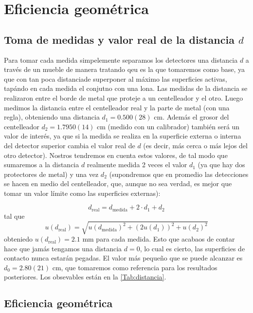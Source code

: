 \documentclass[11pt]{article}
\begin{document}
\section{Eficiencia geométrica}

\subsection{Toma de medidas y valor real de la distancia $d$}

Para tomar cada medida simpelemente separamos los detectores una distancia $d$ a través de un mueble de manera tratando  qeu es la que tomaremos como base, ya que con tan poca distanciade superponer al máximo las superficies activas, tapándo en cada medida el conjutno con una lona. Las medidas de la distancia se realizaron entre el borde de metal que proteje a un centelleador y el otro. Luego medimos la distancia entre el centelleador real y la parte de metal (con una regla), obteniendo una distancia $d_1=0.500(28)$ cm. Además el grosor del centelleador $d_2=1.7950(14)$ cm (medido con un calibrador) también será un valor de interés, ya que si la medida se realiza en la superficie externa o interna del detector superior cambia el valor real de $d$ (es decir, más cerca o más lejos del otro detector). Nostros tendremos en cuenta estos valores, de tal modo que sumaremos a la distancia $d$ realmente medida 2 veces el valor $d_1$ (ya que hay dos protectores de metal) y una vez $d_2$ (supondremos que en promedio las detecciones se hacen en medio del centelleador, que, aunque no sea verdad, es mejor que tomar un valor límite como las superficies externas):

\begin{equation}
	d_{\text{real}} = d_{\text{medida}} + 2 \cdot d_1 + d_2 
\end{equation}
tal que
\begin{equation}
	u(d_{\text{real}}) = \sqrt{u(d_{\text{medida}})^2 + (2 u(d_1))^2 + u(d_2)^2}
\end{equation}
obteniedo $u(d_{\text{real}})=2.1$ mm para cada medida. Esto que acabaos de contar hace que jamás tengamos una distancia $d=0$, lo cual es cierto, las superficies de contacto nunca estarán pegadas. El valor más pequeño que se puede alcanzar es $d_0=2.80(21)$ cm, que tomaremos como referencia para los resultados posteriores. Los obsevables están en la \cref{Tab:distancia}.

\subsection{Eficiencia geométrica}
\end{document}
